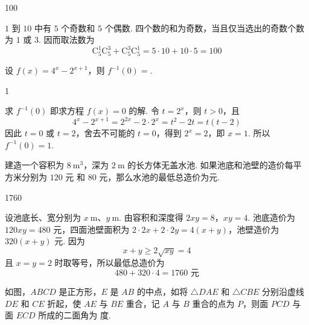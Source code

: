 \documentclass[UTF8,a4paper,oneside,11pt]{ctexbook}
\begin{document}
\begin{answer}
100
\end{answer}

\begin{solution}
\(1\) 到 \(10\) 中有 \(5\) 个奇数和 \(5\) 个偶数. 四个数的和为奇数，当且仅当选出的奇数个数为 \(1\) 或 \(3\). 因而取法数为
\[
\mathrm C_5^1\mathrm C_5^3+\mathrm C_5^3\mathrm C_5^1=5\cdot10+10\cdot5=100
\]
\end{solution}

\begin{problem}
设 \(f(x)=4^x-2^{x+1}\)，则 \(f^{-1}(0)=\)\fillinblank{}.
\end{problem}

\begin{answer}
1
\end{answer}

\begin{solution}
求 \(f^{-1}(0)\) 即求方程 \(f(x)=0\) 的解. 令 \(t=2^x\)，则 \(t>0\)，且
\[
4^x-2^{x+1}=2^{2x}-2\cdot2^x=t^2-2t=t(t-2)
\]
因此 \(t=0\) 或 \(t=2\)，舍去不可能的 \(t=0\)，得到 \(2^x=2\)，即 \(x=1\). 所以 \(f^{-1}(0)=1\).
\end{solution}

\begin{problem}
建造一个容积为 \(8\mathrm{~m}^3\)，深为 \(2\mathrm{~m}\) 的长方体无盖水池. 如果池底和池壁的造价每平方米分别为 \(120\text{ 元}\) 和 \(80\text{ 元}\)，那么水池的最低总造价为\fillinblank{}\(\text{元}\).
\end{problem}

\begin{answer}
1760
\end{answer}

\begin{solution}
设池底长、宽分别为 \(x\mathrm{~m}\)、\(y\mathrm{~m}\). 由容积和深度得
\(2xy=8\)，\(xy=4\).
池底造价为 \(120xy=480\) 元，四面池壁面积为 \(2\cdot2x+2\cdot2y=4(x+y)\)，池壁造价为 \(320(x+y)\) 元. 因为
\[
x+y\geq2\sqrt{xy}=4
\]
且 \(x=y=2\) 时取等号，所以最低总造价为
\[
480+320\cdot4=1760\text{ 元}
\]
\end{solution}

\begin{problem}
如图，\(ABCD\) 是正方形，\(E\) 是 \(AB\) 的中点，如将 \(\triangle DAE\) 和 \(\triangle CBE\) 分别沿虚线 \(DE\) 和 \(CE\) 折起，使 \(AE\) 与 \(BE\) 重合，记 \(A\) 与 \(B\) 重合的点为 \(P\)，则面 \(PCD\) 与面 \(ECD\) 所成的二面角为\fillinblank{} 度.

\end{problem}
\end{document}
